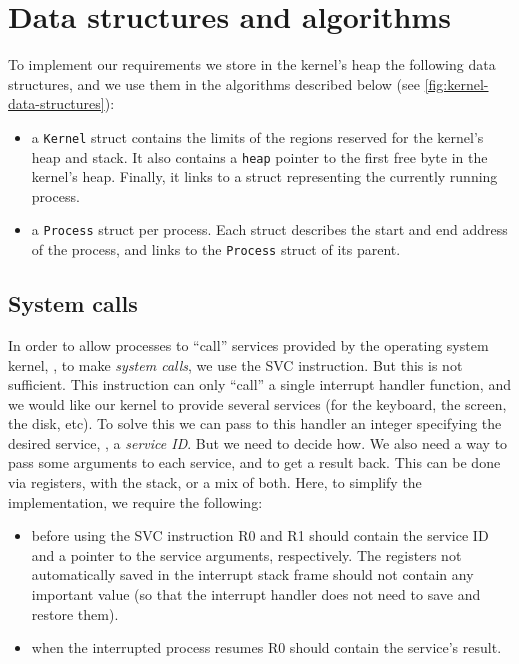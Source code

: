 \section{Data structures and algorithms}

To implement our requirements we store in the kernel's heap the following data
structures, and we use them in the algorithms described below (see
\cref{fig:kernel-data-structures}):
\begin{itemize}
  \item a {\tt Kernel} struct contains the limits of the regions reserved for
  the kernel's heap and stack. It also contains a {\tt heap} pointer to the
  first free byte in the kernel's heap. Finally, it links to a struct
  representing the currently running process.

  \item a {\tt Process} struct per process. Each struct describes the start and
  end address of the process, and links to the {\tt Process} struct of its
  parent.
\end{itemize}

\subsection{System calls}\label{subsection:system-calls}

In order to allow processes to ``call'' services provided by the operating
system kernel, \ie, to make {\em system calls}, we use the SVC instruction. But
this is not sufficient. This instruction can only ``call'' a single interrupt
handler function, and we would like our kernel to provide several services (for
the keyboard, the screen, the disk, etc). To solve this we can pass to this
handler an integer specifying the desired service, \ie, a {\em service ID}. But
we need to decide how. We also need a way to pass some arguments to each
service, and to get a result back. This can be done via registers, with the
stack, or a mix of both. Here, to simplify the implementation, we require the
following:
\begin{itemize}
  \item before using the SVC instruction R0 and R1 should contain the service
  ID and a pointer to the service arguments, respectively. The registers not
  automatically saved in the interrupt stack frame should not contain any
  important value (so that the interrupt handler does not need to save and
  restore them).

  \item when the interrupted process resumes R0 should contain the service's
  result.
\end{itemize}

